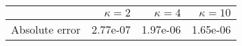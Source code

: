 \begin{tabular}{lrrr}
\toprule
 & $\kappa = 2$ & $\kappa = 4$ & $\kappa = 10$ \\
\midrule
Absolute error & 2.77e-07 & 1.97e-06 & 1.65e-06 \\
\bottomrule
\end{tabular}
